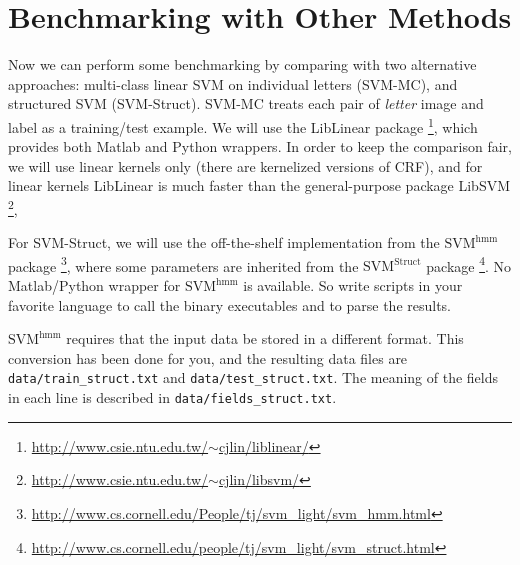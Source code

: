 \documentclass[11pt]{report}
\begin{document}
	
	
	\section{Benchmarking with Other Methods}
	
	Now we can perform some benchmarking by comparing with two alternative approaches:
	multi-class linear SVM on individual letters (SVM-MC),
	and structured SVM (SVM-Struct).
	SVM-MC treats each pair of \emph{letter} image and label as a training/test example.
	We will use the LibLinear package%
	\footnote{\href{http://www.csie.ntu.edu.tw/~cjlin/liblinear/}{http://www.csie.ntu.edu.tw/$\sim$cjlin/liblinear/}},
	which provides both Matlab and Python wrappers.
	In order to keep the comparison fair,
	we will use linear kernels only (there are kernelized versions of CRF),
	and for linear kernels LibLinear is much faster than the general-purpose package LibSVM%
	\footnote{\href{http://www.csie.ntu.edu.tw/~cjlin/libsvm/}{http://www.csie.ntu.edu.tw/$\sim$cjlin/libsvm/}},
	
	
	For SVM-Struct, we will use the off-the-shelf implementation from the $\text{SVM}^{\text{hmm}}$ package%
	\footnote{\href{http://www.cs.cornell.edu/People/tj/svm_light/svm_hmm.html}{http://www.cs.cornell.edu/People/tj/svm\_light/svm\_hmm.html}},
	where some parameters are inherited from the $\text{SVM}^{\text{Struct}}$ package%
	\footnote{\href{http://www.cs.cornell.edu/people/tj/svm_light/svm_struct.html}{http://www.cs.cornell.edu/people/tj/svm\_light/svm\_struct.html}}.
	No Matlab/Python wrapper for $\text{SVM}^{\text{hmm}}$ is available.
	So write scripts in your favorite language to call the binary executables and to parse the results.
	
	
	$\text{SVM}^{\text{hmm}}$ requires that the input data be stored in a different format.
	This conversion has been done for you, and the resulting data files are \verb#data/train_struct.txt# and \verb#data/test_struct.txt#.
	The meaning of the fields in each line is described in \verb#data/fields_struct.txt#.
	
	
	
\end{document}
